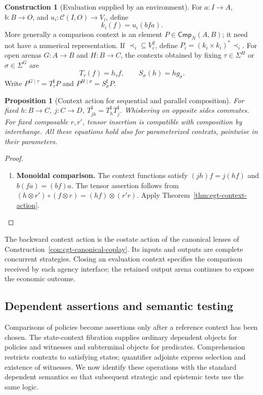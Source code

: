 \documentclass[11pt,a4paper]{article}
\numberwithin{equation}{section}
\newtheorem{proposition}[theorem]{Proposition}
\theoremstyle{definition}
\newtheorem{construction}[construction]{Construction}
\theoremstyle{remark}
\theoremstyle{plain}
\begin{document}
\begin{construction}[Evaluation supplied by an environment]
\label{con:egt-environment}
For $a:I\to A$, $b:B\to O$, and
$u_i:\mathcal C(I,O)\to V_i$, define
\[
 k_i(f)=u_i(bfa).
\]
More generally a comparison context is an element
$P\in\mathsf{Cmp}_N(A,B)$; it need not have a numerical representation.
If $\prec_i\subseteq V_i^2$, define
$P_i=(k_i\times k_i)^*\prec_i$.
For open arenas $G:A\to B$ and $H:B\to C$, the contexts obtained by fixing
$\tau\in\Sigma^H$ or $\sigma\in\Sigma^G$ are
\[
 T_\tau(f)=h_\tau f,
 \qquad S_\sigma(h)=hg_\sigma.
\]
Write $P^{G\mid\tau}=T_\tau^\sharp P$ and
$P^{H\mid\sigma}=S_\sigma^\sharp P$.
\end{construction}

\begin{proposition}[Context action for sequential and parallel composition]
\label{prop:egt-context-composition}
For fixed $h:B\to C$, $j:C\to D$,
$T_{jh}^\sharp=T_h^\sharp T_j^\sharp$.
Whiskering on opposite sides commutes. For fixed composable $r,r'$, tensor
insertion is compatible with composition by interchange. All these equations
hold also for parameterized contexts, pointwise in their parameters.
\end{proposition}
\begin{proof}
\leavevmode
\begin{enumerate}[label=\textup{(\arabic*)},leftmargin=*,itemsep=4pt,topsep=3pt]
  \item \textbf{Monoidal comparison.} The context functions satisfy $(jh)f=j(hf)$ and $b(fa)=(bf)a$. The tensor assertion follows from
$(h\otimes r')\circ(f\otimes r)=(hf)\otimes(r'r)$. Apply Theorem~\ref{thm:egt-context-action}.
\end{enumerate}
\end{proof}

The backward context action is the costate action of the canonical lenses
of Construction~\ref{con:cgt-canonical-coplay}. Its inputs and outputs are
complete concurrent strategies. Closing an evaluation context specifies
the comparison received by each agency interface; the retained output
arena continues to expose the economic outcome.

\subsection{Dependent assertions and semantic testing}
\label{sec:egt-assertions}

Comparisons of policies become assertions only after a reference
context has been chosen. The state-context fibration supplies ordinary
dependent objects for policies and witnesses and subterminal objects for
predicates. Comprehension restricts contexts to satisfying states;
quantifier adjoints express selection and existence of witnesses.
We now identify these operations with the standard dependent semantics
so that subsequent strategic and epistemic tests use the same logic.
\end{document}

